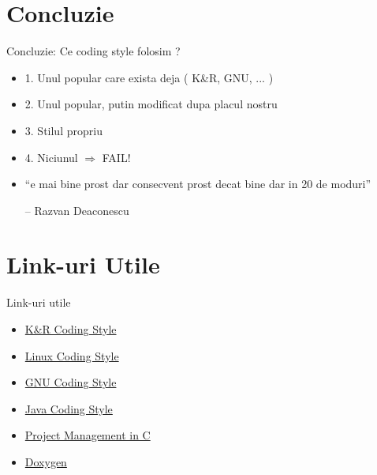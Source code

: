 \documentclass{beamer}
\begin{document}
\section{Concluzie}
  
  \frame{\tableofcontents[currentsection]}
  
  \begin{frame}{Concluzie:}
  Ce coding style folosim ?
  \begin{itemize}
  \item 1. Unul popular care exista deja ( K\&R, GNU, ... )
  \item 2. Unul popular, putin modificat dupa placul nostru
  \item 3. Stilul propriu
  \item 4. Niciunul $\Rightarrow$ FAIL!
  \vspace{0.9cm}
  \pause \item ``e mai bine prost dar consecvent prost decat bine dar in 20 de moduri''\\ \begin{flushright}-- Razvan Deaconescu \end{flushright}
  \end{itemize}
  \end{frame}

\section{Link-uri Utile}

  \frame{\tableofcontents[currentsection]}

  \begin{frame}{Link-uri utile}
  \begin{itemize}
  \setlength{\itemsep}{0.5cm}
  \item \href{http://www.cs.su.oz.au/\~scilect/tpop/handouts/Style.htm}{K\&R Coding Style}
  \item \href{http://lxr.linux.no/linux/Documentation/CodingStyle}{Linux Coding Style}
  \item \href{http://www.gnu.org/prep/standards/standards.html}{GNU Coding Style}
  \item \href{http://java.sun.com/docs/codeconv/}{Java Coding Style}
  \item \href{http://www.cs.cf.ac.uk/Dave/C/node35.html}{Project Management in C}
  \item \href{http://www.stack.nl/\~dimitri/doxygen/}{Doxygen}
  \end{itemize}
  \end{frame}
\end{document}
